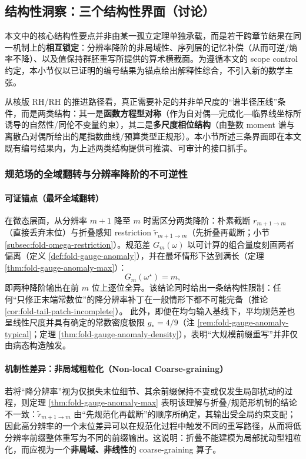 \subsection{结构性洞察：三个结构性界面（讨论）}\label{subsec:structural-insights}
本文中的核心结构性要点并非由某一孤立定理单独承载，而是若干跨章节结果在同一机制上的\textbf{相互锁定}：分辨率降阶的非局域性、序列层的记忆补偿（从而可逆/熵率不降）、以及值保持群胚重写所提供的算术横截面。为遵循本文的 scope control 约定，本小节仅以已证明的编号结果为锚点给出解释性综合，不引入新的数学主张。
\par
从核版 RH/RH 的推进路径看，真正需要补足的并非单尺度的“谱半径压线”条件，而是两类结构：其一是\textbf{函数方程型对称}（作为自对偶—完成化—临界线坐标所诱导的自然性/同伦不变量约束），其二是\textbf{多尺度相位结构}（由整数 moment 谱与离散凸对偶所给出的尾指数曲线/预算类型正规形）。本小节所述三条界面即在本文既有编号结果内，为上述两类结构提供可推演、可审计的接口抓手。

\subsubsection{规范场的全域翻转与分辨率降阶的不可逆性}\label{subsubsec:insight-gauge-anomaly}
\paragraph{可证锚点（最坏全域翻转）}
在微态层面，从分辨率 \(m+1\) 降至 \(m\) 时需区分两类降阶：朴素截断 \(r_{m+1\to m}\)（直接丢弃末位）与折叠感知 restriction \(\widetilde r_{m+1\to m}\)（先折叠再截断；小节 \ref{subsec:fold-omega-restriction}）。规范差 \(G_m(\omega)\) 以可计算的组合量度刻画两者偏离（定义 \ref{def:fold-gauge-anomaly}），并在最坏情形下达到满长（定理 \ref{thm:fold-gauge-anomaly-max}）：
\[
G_m(\omega^\star)=m,
\]
即两种降阶输出在前 \(m\) 位上逐位全异。该结论同时给出一条结构性限制：任何“只修正末端常数位”的降分辨率补丁在一般情形下都不可能完备（推论 \ref{cor:fold-tail-patch-incomplete}）。
此外，即便在均匀输入基线下，平均规范差也呈线性尺度并具有确定的常数密度极限 \(g_\ast=4/9\)（注 \ref{rem:fold-gauge-anomaly-typical}；定理 \ref{thm:fold-gauge-anomaly-density}），表明“大规模前缀重写”并非仅由病态构造触发。

\paragraph{机制性差异：非局域粗粒化（Non-local Coarse-graining）}
若将“降分辨率”视为仅损失末位细节、其余前缀保持不变或仅发生局部扰动的过程，则定理 \ref{thm:fold-gauge-anomaly-max} 表明该理解与折叠/规范形机制的结论不一致：\(\widetilde r_{m+1\to m}\) 由“先规范化再截断”的顺序所确定，其输出受全局约束支配；因此高分辨率的一个末位差异可以在规范化过程中触发不同的重写路径，从而将低分辨率前缀整体重写为不同的前缀输出。这说明：折叠不能建模为局部扰动型粗粒化，而应视为一个\textbf{非局域、非线性}的 coarse-graining 算子。

